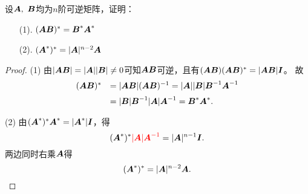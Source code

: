 \begin{frame}
\begin{li}
  设$\MA,~\MB$均为$n$阶可逆矩阵，证明：
  \begin{itemize}
  \item[(1).] $(\MA\MB)^*=\MB^*\MA^*$
  \item[(2).] $(\MA^*)^*=|\MA|^{n-2}\MA$ 
  \end{itemize}
\end{li}
\begin{proof}

(1) 由$|\MA\MB| = |\MA||\MB| \ne 0$可知$\MA\MB$可逆，且有$(\MA\MB)(\MA\MB)^*=|\MA\MB|\MI$。\pause 
故
$$
\begin{array}{cl}
  (\MA\MB)^* &  =|\MA\MB| (\MA\MB)^{-1}
             = |\MA||\MB| \MB^{-1}\MA^{-1} \\[0.2cm]
           & \ds = |\MB| \MB^{-1} |\MA| \MA^{-1}   = \MB^*\MA^*.      
\end{array}
$$ \pause 


(2) 由$(\MA^*)^* \MA^* = |\MA^*|\MI$，得 
$$(\MA^*)^* \red{|\MA|\MA^{-1}} = |\MA|^{n-1}\MI.$$  \pause 
两边同时右乘$\MA$得
$$
(\MA^*)^*=|\MA|^{n-2}\MA.
$$
\end{proof}
\end{frame}

